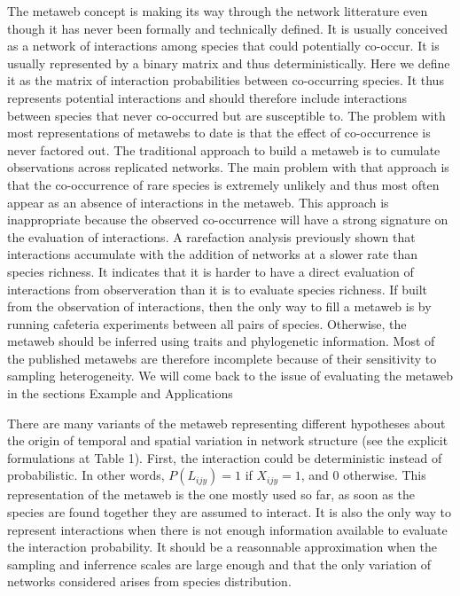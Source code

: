 \documentclass[12pt]{article}
\begin{document}
The metaweb concept is making its way through the network litterature even
though it has never been formally and technically defined. It is usually
conceived as a network of interactions among species that could potentially
co-occur. It is usually represented by a binary matrix and thus
deterministically. Here we define it as the matrix of interaction probabilities
between co-occurring species. It thus represents potential interactions and
should therefore include interactions between species that never co-occurred but
are susceptible to. The problem with most representations of metawebs to date is
that the effect of co-occurrence is never factored out. The traditional approach
to build a metaweb is to cumulate observations across replicated networks. The
main problem with that approach is that the co-occurrence of rare species is
extremely unlikely and thus most often appear as an absence of interactions in
the metaweb. This approach is inappropriate because the observed co-occurrence
will have a strong signature on the evaluation of interactions. A rarefaction
analysis previously shown that interactions accumulate with the addition of
networks at a slower rate than species richness. It indicates that it is harder
to have a direct evaluation of interactions from observeration than it is to
evaluate species richness. If built from the observation of interactions, then
the only way to fill a metaweb is by running cafeteria experiments between all
pairs of species. Otherwise, the metaweb should be inferred using traits and
phylogenetic information. Most of the published metawebs are therefore
incomplete because of their sensitivity to sampling heterogeneity. We will come
back to the issue of evaluating the metaweb in the sections Example and Applications

There are many variants of the metaweb representing different hypotheses about
the origin of temporal and spatial variation in network structure (see the
explicit formulations at Table 1). First, the interaction could be 
deterministic instead of probabilistic. In other words, $P(L_{ijy}) = 1$ if
$X_{ijy} = 1$, and 0 otherwise. This representation of the metaweb is the one
mostly used so far, as soon as the species are found together they are assumed
to interact. It is also the only way to represent interactions when there is not
enough information available to evaluate the interaction probability. It should be a
reasonnable approximation when the sampling and inferrence scales are large
enough and that the only variation of networks considered arises from species
distribution. 
\end{document}

